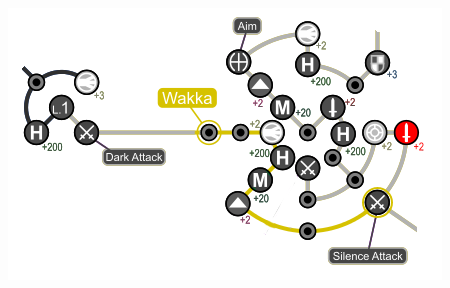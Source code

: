 \begin{spheregrid}
\begin{itemize}
\begin{itemize}
		\end{itemize}
		\includegraphics{graphics/Wakka_Grid}
	\end{itemize}
\end{spheregrid}


